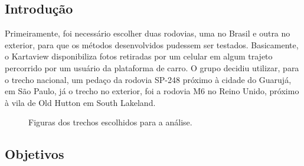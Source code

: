\documentclass{article}
\begin{document}
\subsection{Introdução}

\qquad Primeiramente, foi necessário escolher duas rodovias, uma no Brasil e outra no exterior, para que os métodos desenvolvidos pudessem ser testados. Basicamente, o Kartaview disponibiliza fotos retiradas por um celular em algum trajeto percorrido por um usuário da plataforma de carro. O grupo decidiu utilizar, para o trecho nacional, um pedaço da rodovia SP-248 próximo à cidade do Guarujá, em São Paulo, já o trecho no exterior, foi a rodovia M6 no Reino Unido, próximo à vila de Old Hutton em South Lakeland.

\begin{figure}[!h]
    \centering
    \qquad
    \qquad
    \caption{Figuras dos trechos escolhidos para a análise.}
\end{figure}

\subsection{Objetivos}
\end{document}
